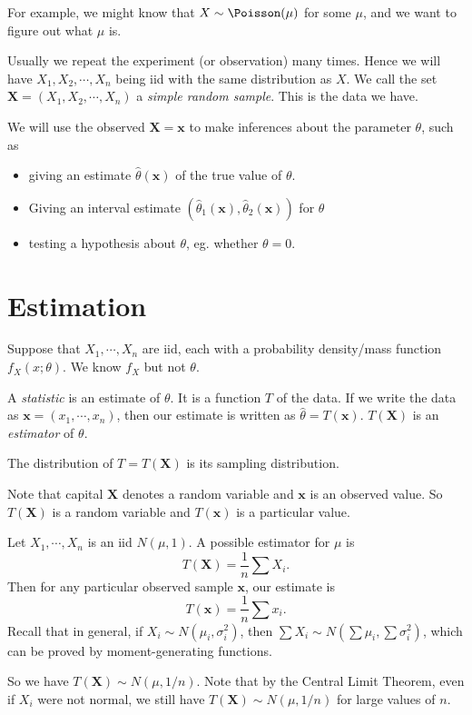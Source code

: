 \documentclass[a4paper]{article}
\begin{document}
For example, we might know that $X\sim \Poisson (\mu)$ for some $\mu$, and we want to figure out what $\mu$ is.

Usually we repeat the experiment (or observation) many times. Hence we will have $X_1, X_2, \cdots, X_n$ being iid with the same distribution as $X$. We call the set $\mathbf{X} = (X_1, X_2, \cdots, X_n)$ a \emph{simple random sample}. This is the data we have.

We will use the observed $\mathbf{X} = \mathbf{x}$ to make inferences about the parameter $\theta$, such as
\begin{itemize}
  \item giving an estimate $\hat{\theta}(\mathbf{x})$ of the true value of $\theta$.
  \item Giving an interval estimate $(\hat{\theta}_1(\mathbf{x}), \hat{\theta}_2(\mathbf{x}))$ for $\theta$
  \item testing a hypothesis about $\theta$, eg. whether $\theta = 0$.
\end{itemize}
\section{Estimation}
Suppose that $X_1, \cdots, X_n$ are iid, each with a probability density/mass function $f_X(x; \theta)$. We know $f_X$ but not $\theta$.

\begin{defi}[Statistic]
  A \emph{statistic} is an estimate of $\theta$. It is a function $T$ of the data. If we write the data as $\mathbf{x} = (x_1, \cdots, x_n)$, then our estimate is written as $\hat{\theta} = T(\mathbf{x})$. $T(\mathbf{X})$ is an \emph{estimator} of $\theta$.

  The distribution of $T = T(\mathbf{X})$ is its sampling distribution.

  Note that capital $\mathbf{X}$ denotes a random variable and $\mathbf{x}$ is an observed value. So $T(\mathbf{X})$ is a random variable and $T(\mathbf{x})$ is a particular value.
\end{defi}

\begin{eg}
  Let $X_1, \cdots, X_n$ is an iid $N(\mu, 1)$. A possible estimator for $\mu$ is
  \[
    T(\mathbf{X}) = \frac{1}{n}\sum X_i.
  \]
  Then for any particular observed sample $\mathbf{x}$, our estimate is
  \[
    T(\mathbf{x}) = \frac{1}{n}\sum x_i.
  \]
  Recall that in general, if $X_i \sim N(\mu_i, \sigma_i^2)$, then $\sum X_i \sim N(\sum \mu_i, \sum \sigma_i^2)$, which can be proved by moment-generating functions.

  So we have $T(\mathbf{X})\sim N(\mu, 1/n)$. Note that by the Central Limit Theorem, even if $X_i$ were not normal, we still have $T(\mathbf{X})\sim N(\mu, 1/n)$ for large values of $n$.
\end{eg}
\end{document}

